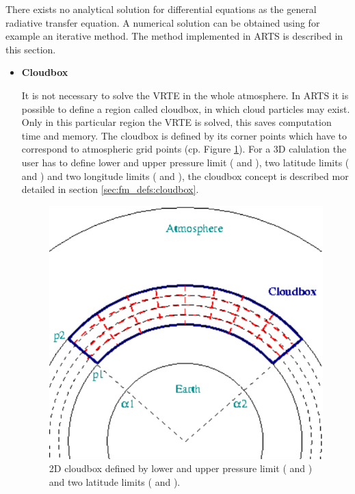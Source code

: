\label{sec:scattering:solution_rte}

There exists no analytical solution for differential equations as the general
radiative transfer equation. A numerical solution can be obtained using for example an iterative method. The method implemented in ARTS is described in this section. 

\begin{itemize}
\item{\bf Cloudbox}

It is not necessary to solve the VRTE in the whole atmosphere. In ARTS it is possible to define a region called cloudbox, in which cloud particles may exist. Only in this particular region the VRTE is solved, this saves computation time and memory. 
The cloudbox is defined by its corner points which have to correspond to atmospheric grid points (cp. Figure \ref{fig:scattering:cloudbox}). For a 3D calulation the user has to define lower and upper pressure limit ( and ), two latitude limits ( and ) and two longitude limits ( and ), the cloudbox concept is described mor detailed in section \ref{sec:fm_defs:cloudbox}.

\begin{figure}[htbp]
 \begin{center}
  \begin{minipage}[c]{0.65\textwidth}
   \begin{center}
    \includegraphics*[width=0.9\hsize]{Figs/scattering/cloudbox}
   \end{center}
  \end{minipage}%
  \begin{minipage}[c]{0.35\textwidth}
   \caption{2D cloudbox defined by lower and upper pressure limit ( and ) and two latitude limits ( and ).}
   \label{fig:scattering:cloudbox}
  \end{minipage}
 \end{center}
\end{figure}   


\end{itemize}
